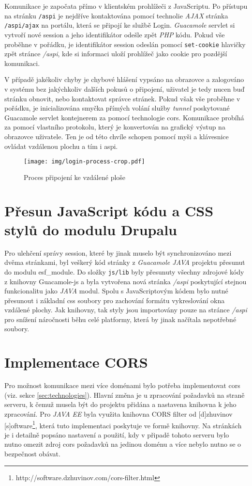 Komunikace je započata přímo v klientském prohlížeči z JavaScriptu. Po přístupu na stránku \texttt{/aspi} je nejdříve kontaktována pomocí technolie \emph{AJAX} stránka \texttt{/aspi/ajax} na portálu, která se připojí ke službě Login. \emph{Guacamole} \gls{servlet} si vytvoří nové \gls{session} a jeho identifikátor odešle zpět \emph{PHP} kódu. Pokud vše proběhne v pořádku, je identifikátor \gls{session} odeslán pomocí \texttt{set-cookie} hlavičky zpět stránce \emph{/aspi}, kde si informaci uloží prohlížeč jako cookie pro pozdější komunikaci. 

V případě jakékoliv chyby je chybové hlášení vypsáno na obrazovce a zalogováno v systému bez jakýchkoliv dalších pokusů o připojení, uživatel je tedy nucen buď stránku obnovit, nebo kontaktovat správce stránek. Pokud však vše proběhne v pořádku, je inicializována smyčka přímých volání služby \emph{tunnel} poskytované Guacamole \gls{servlet} kontejnerem za pomocí technologie \gls{cors}. Komunikace probíhá za pomocí vlastního protokolu, který je konvertován na grafický výstup na obrazovce uživatele. Ten je od této chvíle schopen pomocí myši a klávesnice ovládat vzdálenou plochu a tím i \gls{aspi}.

\begin{figure}[]
  \texttt{[image: img/login-process-crop.pdf]}
  \caption{Proces připojení ke vzdálené ploše}
  \label{fig:login_process}
\end{figure}  

\section{Přesun JavaScript kódu a CSS stylů do modulu Drupalu}
Pro ulehčení správy \gls{session}, které by jinak muselo být synchronizováno mezi dvěma stránkami, byl veškerý kód stránky z \emph{Guacamole JAVA} projektu přesunut do modulu esf\_module. Do složky \texttt{js/lib} byly přesunuty všechny zdrojové kódy z knihovny Guacamole-js a byla vytvořena nová stránka \emph{/aspi} poskytující stejnou funkcionalitu jako \emph{JAVA} modul. Spolu s JavaScriptovým kódem bylo nutné přesunout i základní \gls{css} soubory pro zachování formátu vykreslování okna vzdálené plochy. Jak knihovny, tak styly jsou importovány pouze na stránce \emph{/aspi} pro snížení náročnosti běhu celé platformy, která by jinak načítala nepotřebné soubory. 

\section{Implementace CORS}
Pro možnost komunikace mezi více doménami bylo potřeba implementovat \gls{cors} (viz. sekce \ref{sec:technologies}). Hlavní změna je u zpracování požadavků na straně serveru, k čemuž musela být do projektu přidána a nastavena knihovna k jeho zpracování. Pro \emph{JAVA EE} byla využita knihovna CORS filter od [d]zhuvinov  [s]oftware\footnote{http://software.dzhuvinov.com/cors-filter.html}, která tuto implementaci poskytuje ve formě knihovny. Na stránkách je i detailně popsáno nastavení a použití, kdy v připadě tohoto serveru bylo nutno omezit zdroj \gls{cors} požadavků na jedinou doménu a více nebylo nutno se o bezpečnost obávat.

